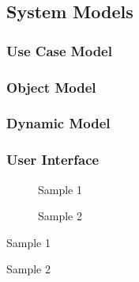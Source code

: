 \documentclass[12pt,letterpaper]{article}
\begin{document}
\subsection{System Models}


\subsubsection{Use Case Model}


\subsubsection{Object Model}


\subsubsection{Dynamic Model}


\subsubsection{User Interface}

\begin{figure}[H]
\protect\caption{Sample 1}


\end{figure}


\begin{figure}[H]
\protect\caption{Sample 2}


\end{figure}


\begin{table}[H]
\protect\caption{Sample 1}


\end{table}


\begin{table}[H]
\protect\caption{Sample 2}


\end{table}
\end{document}
